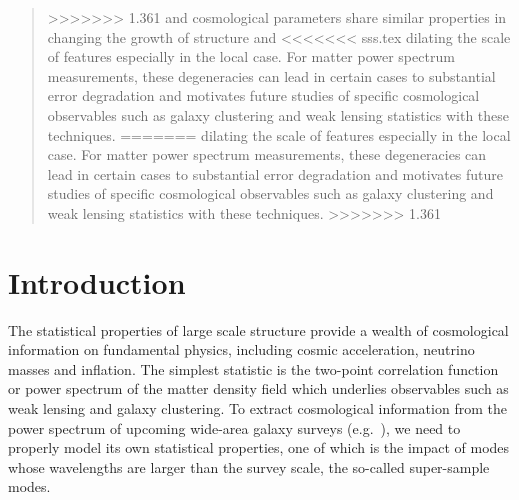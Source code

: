 \documentclass[prd,twocolumn,amsmath,amssymb,floatfix,superscriptaddress]{revtex4-1}
\begin{document}
\begin{abstract}
{>>>>>>> 1.361
and cosmological parameters share similar properties in changing the growth of structure and
<<<<<<< sss.tex
dilating the scale of features  especially in the local case.   For matter power spectrum measurements, these degeneracies can lead in certain cases to substantial error degradation 
and motivates future studies of specific cosmological observables such as galaxy clustering
and weak lensing statistics with these techniques.}
=======
dilating the scale of features  especially in the local case.   For matter power spectrum measurements, these degeneracies can lead in certain cases to substantial error degradation 
and motivates future studies of specific cosmological observables such as galaxy clustering
and weak lensing statistics with these techniques.
>>>>>>> 1.361
\end{abstract}

\maketitle




\section{Introduction}

The statistical properties of large scale structure provide a
wealth of cosmological information on fundamental physics, including
cosmic acceleration, neutrino masses and inflation. The simplest
statistic is the two-point correlation function or power spectrum of the
matter density field which underlies observables such as weak lensing
and galaxy clustering. To extract cosmological information from  the power spectrum of upcoming wide-area galaxy surveys (e.g.~\cite{TakadaPFS:14}), we need to properly model its own statistical 
properties, one of which is the impact of modes whose wavelengths are
larger than the survey scale, the so-called super-sample modes.
\end{document}
